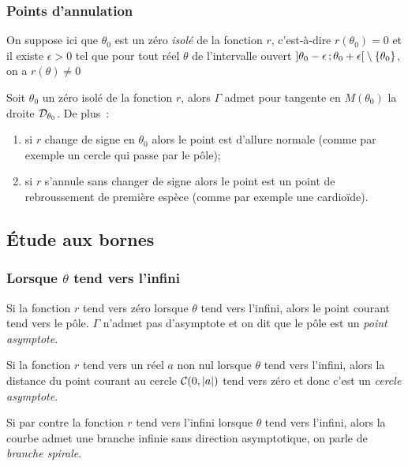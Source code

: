 \subsubsection{Points d'annulation}
On suppose ici que \(\theta_0\) est un zéro \emph{isolé} de la fonction \(r\), 
c'est-à-dire \(r(\theta_0)=0\) et il existe \(\epsilon >0\) tel que pour tout 
réel \(\theta\) de l'intervalle ouvert 
\(\left] \theta_0-\epsilon \, ;  \theta_0 + \epsilon \right[\setminus\{\theta_0\}\), 
on a \(r(\theta) \neq 0\)

\begin{prop}[admise]
  Soit \(\theta_0\) un zéro isolé de la fonction \(r\), alors \(\Gamma\) admet 
  pour tangente en \(M(\theta_0)\) la droite \(\mathcal{D}_{\theta_0}\). De plus~:
  \begin{enumerate}
    \item si \(r\) change de signe en \(\theta_0\) alors le point est d'allure 
      normale (comme par exemple un cercle qui passe par le pôle);
    \item si \(r\) s'annule sans changer de signe alors le point est un point de 
      rebroussement de première espèce (comme par exemple une cardioïde).
  \end{enumerate}
\end{prop}

\subsection{Étude aux bornes}
\subsubsection{Lorsque \(\theta\) tend vers l'infini}
Si la fonction \(r\) tend vers zéro lorsque \(\theta\) tend vers l'infini, alors 
le point courant tend vers le pôle. \(\Gamma\) n'admet pas d'asymptote et on dit 
que le pôle est un \emph{point asymptote}.

Si la fonction \(r\) tend vers un réel \(a\) non nul lorsque \(\theta\) tend 
vers l'infini, alors la distance du point courant au cercle 
\(\mathcal{C}(0,\left\lvert a\right\rvert)\) tend vers zéro et donc c'est un \emph{cercle asymptote}.

Si par contre la fonction \(r\) tend vers l'infini lorsque \(\theta\) tend vers 
l'infini, alors la courbe admet une branche infinie sans direction asymptotique, 
on parle de \emph{branche spirale}.

